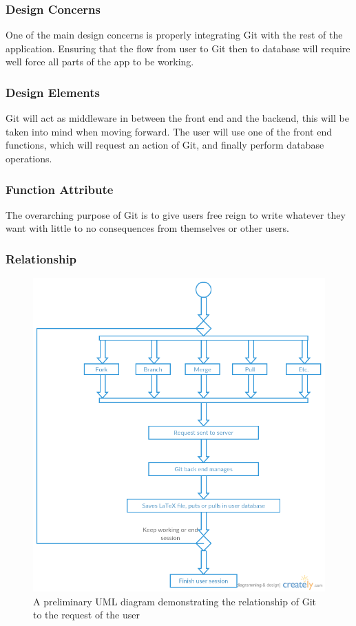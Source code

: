 \documentclass[letterpaper, 10pt, draftclsnofoot, compsoc, onecolumn]{IEEEtran}
\begin{document}
\subsubsection{Design Concerns}
{\noindent One of the main design concerns is properly integrating Git with the rest of the application.
Ensuring that the flow from user to Git then to database will require well force all parts of the app to be working.
 \par}

\subsubsection{Design Elements}
{\noindent Git will act as middleware in between the front end and the backend, this will be taken into mind when moving forward.
The user will use one of the front end functions, which will request an action of Git, and finally perform database operations. \par}

\subsubsection{Function Attribute}
{\noindent The overarching purpose of Git is to give users free reign to write whatever they want with little to no consequences
from themselves or other users. \par}

\newpage
\subsubsection{Relationship}
\begin{figure}[ht!]
\centering
\includegraphics[width=120mm]{Revision_Control.png}
\caption{A preliminary UML diagram demonstrating the relationship of Git to the request of the user}
\end{figure}
\end{document}

